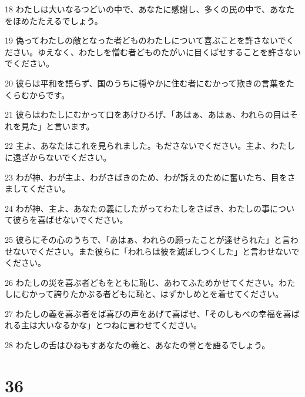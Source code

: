 \par 18 わたしは大いなるつどいの中で、あなたに感謝し、多くの民の中で、あなたをほめたたえるでしょう。
\par 19 偽ってわたしの敵となった者どものわたしについて喜ぶことを許さないでください。ゆえなく、わたしを憎む者どものたがいに目くばせすることを許さないでください。
\par 20 彼らは平和を語らず、国のうちに穏やかに住む者にむかって欺きの言葉をたくらむからです。
\par 21 彼らはわたしにむかって口をあけひろげ、「あはぁ、あはぁ、われらの目はそれを見た」と言います。
\par 22 主よ、あなたはこれを見られました。もださないでください。主よ、わたしに遠ざからないでください。
\par 23 わが神、わが主よ、わがさばきのため、わが訴えのために奮いたち、目をさましてください。
\par 24 わが神、主よ、あなたの義にしたがってわたしをさばき、わたしの事について彼らを喜ばせないでください。
\par 25 彼らにその心のうちで、「あはぁ、われらの願ったことが達せられた」と言わせないでください。また彼らに「われらは彼を滅ぼしつくした」と言わせないでください。
\par 26 わたしの災を喜ぶ者どもをともに恥じ、あわてふためかせてください。わたしにむかって誇りたかぶる者どもに恥と、はずかしめとを着せてください。
\par 27 わたしの義を喜ぶ者をば喜びの声をあげて喜ばせ、「そのしもべの幸福を喜ばれる主は大いなるかな」とつねに言わせてください。
\par 28 わたしの舌はひねもすあなたの義と、あなたの誉とを語るでしょう。

\chapter{36}

